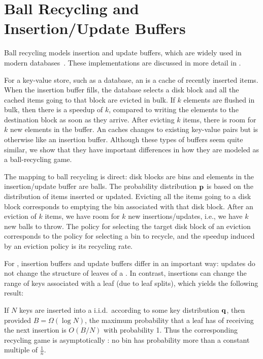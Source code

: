 
\section{Ball Recycling and Insertion/Update Buffers}\label{sec:motivation}

Ball recycling models insertion and update buffers, which are widely used in
modern databases~\cite{Azure16, IBM17, Xiang12, Informix, Callaghan11, NuDB16,
Oracle17, SAP17, Vertica17,DBLP:conf/vldb/CanimMBLR10,DBLP:journals/pvldb/BenderFJKKMMSSZ12}. These implementations are
discussed in more detail in .

For a key-value store, such as a database, an  is a
cache of recently inserted items.  When the insertion buffer fills, the
database selects a disk block and all the cached items going to that block are
evicted in bulk.  If $k$ elements are flushed in bulk, then there is a speedup
of $k$, compared to writing the elements to the destination block as soon as
they arrive. After evicting $k$ items, there is room for $k$ new elements in
the buffer.  An  caches changes to existing key-value pairs
but is otherwise like an insertion buffer.  Although these types of buffers
seem quite similar, we show that they have important differences in how they
are modeled as a ball-recycling game.

The mapping to ball recycling is direct: disk blocks are bins and elements in
the insertion/update buffer are balls.  The probability distribution $\mathbf{p}$ is
based on the distribution of items inserted  or updated.  Evicting all the
items going to a disk block corresponds to emptying the bin associated with
that disk block.  After an eviction of $k$ items, we have room for $k$ new
insertions/updates, i.e., we have $k$ new balls to throw.  The policy for
selecting the target disk block of an eviction corresponds to the policy for
selecting a bin to recycle, and the speedup induced by an eviction policy is
its recycling rate.  

For \btrees{}, insertion buffers and update buffers differ in an important way:
updates do not change the structure of leaves of a \btree{}. In contrast,
insertions can change the range of keys associated with a leaf (due to leaf
splits), which yields the following result:

\begin{lemma}\label{lem:uniform-leaves}
	If $N$ keys are inserted into a \btree{} i.i.d.\ according to some key
	distribution $\mathbf{q}$, then provided $B = \Omega(\log{N})$, the maximum
	probability that a leaf has of receiving the next insertion is $O(B/N)$
	with probability 1.  Thus the corresponding recycling game is
	asymptotically : no bin has probability more than a
	constant multiple of $\frac{1}{n}$.
\end{lemma}

